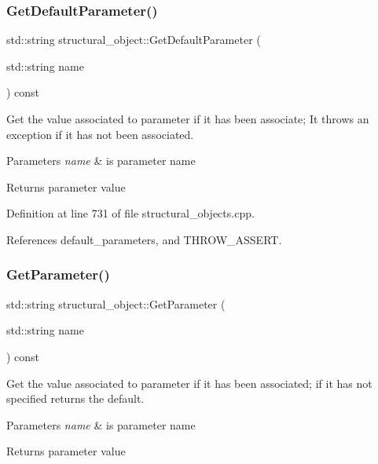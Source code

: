 \subsubsection{\texorpdfstring{Get\+Default\+Parameter()}{GetDefaultParameter()}}
{\footnotesize\ttfamily std\+::string structural\+\_\+object\+::\+Get\+Default\+Parameter (\begin{DoxyParamCaption}\item[{std\+::string}]{name }\end{DoxyParamCaption}) const}



Get the value associated to parameter if it has been associate; It throws an exception if it has not been associated. 


\begin{DoxyParams}{Parameters}
{\em name} & is parameter name \\
\hline
\end{DoxyParams}
\begin{DoxyReturn}{Returns}
parameter value 
\end{DoxyReturn}


Definition at line 731 of file structural\+\_\+objects.\+cpp.



References default\+\_\+parameters, and T\+H\+R\+O\+W\+\_\+\+A\+S\+S\+E\+RT.

\mbox{\label{classstructural__object_a34b15e206f9c2911854a5fc785de001d}} 
\subsubsection{\texorpdfstring{Get\+Parameter()}{GetParameter()}}
{\footnotesize\ttfamily std\+::string structural\+\_\+object\+::\+Get\+Parameter (\begin{DoxyParamCaption}\item[{std\+::string}]{name }\end{DoxyParamCaption}) const}



Get the value associated to parameter if it has been associated; if it has not specified returns the default. 


\begin{DoxyParams}{Parameters}
{\em name} & is parameter name \\
\hline
\end{DoxyParams}
\begin{DoxyReturn}{Returns}
parameter value 
\end{DoxyReturn}


